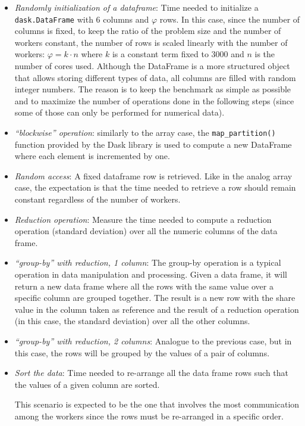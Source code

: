 \begin{itemize}
  \itemsep0em
  \item \textit{Randomly initialization of a dataframe}: Time needed to
    initialize a  \texttt{dask.DataFrame} with $6$ columns and $\varphi$ rows.
    In this case, since the number of columns is fixed, to keep the ratio of the
    problem size and the number of workers constant, the number of rows is
    scaled linearly with the number of workers: $\varphi = k \cdot n$ where $k$
    is a constant term fixed to $3000$ and $n$ is the number of cores used.
    Although the DataFrame is a more structured object that allows storing
    different types of data, all columns are filled with random integer numbers.
    The reason is to keep the benchmark as simple as possible and to maximize
    the number of operations done in the following steps (since some of those
    can only be performed for numerical data).
  \item \textit{``blockwise'' operation}: similarly to the array case, the
    \texttt{map\_partition()} function provided by the Dask library is used to
    compute a new DataFrame where each element is incremented by one.
  \item \textit{Random access}: A fixed dataframe row is retrieved.
    Like in the analog array case, the expectation is that the time needed to
    retrieve a row should remain constant regardless of the number of workers.
  \item \textit{Reduction operation}: Measure the time needed to compute a
    reduction operation (standard deviation) over all the numeric columns of the
    data frame.
  \item \textit{``group-by'' with reduction, 1 column}: The group-by operation
    is a typical operation in data manipulation and processing. Given a data
    frame, it will return a new data frame where all the rows with the same
    value over a specific column are grouped together.
    The result is a new row with the share value in the column taken as
    reference and the result of a reduction operation (in this case, the
    standard deviation) over all the other columns.
  \item \textit{``group-by'' with reduction, 2 columns}: Analogue to the
    previous case, but in this case, the rows will be grouped by the values of a
    pair of columns.
  \item \textit{Sort the data}: Time needed to re-arrange all the data frame
    rows such that the values of a given column are sorted.

    This scenario is expected to be the one that involves the most communication
    among the workers since the rows must be re-arranged in a specific order.
\end{itemize}


